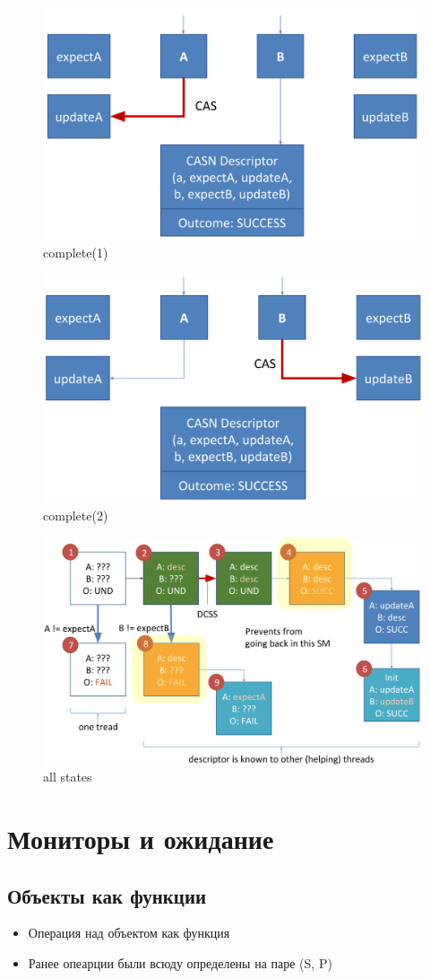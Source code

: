 \documentclass[10pt,a4paper,oneside,titlepage]{article}
\theoremstyle{plain}
\theoremstyle{defenition}
\begin{document}
\begin{figure}[h!]
	\centering
	\includegraphics[width=0.4\linewidth]{pictures/CASN5}
	\caption{complete(1)}
	\label{fig:casn5}
\end{figure}

\begin{figure}[h!]
	\centering
	\includegraphics[width=0.4\linewidth]{pictures/CASN6}
	\caption{complete(2)}
	\label{fig:casn6}
\end{figure}

\begin{figure}[h!]
	\centering
	\includegraphics[width=0.5\linewidth]{pictures/CASN7}
	\caption{all states}
	\label{fig:casn7}
\end{figure}


\section{Мониторы и ожидание}
\subsection{Объекты как функции}
\begin{itemize}
	\item Операция над объектом как функция
	\item Ранее опеарции были всюду определены на паре (S, P)
\end{itemize}
\end{document}
